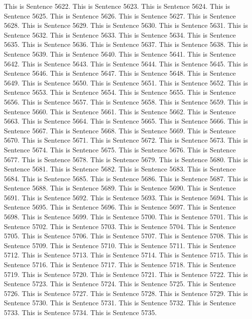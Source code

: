 \documentclass{article}
\begin{document}
This is Sentence 5622.
This is Sentence 5623.
This is Sentence 5624.
This is Sentence 5625.
This is Sentence 5626.
This is Sentence 5627.
This is Sentence 5628.
This is Sentence 5629.
This is Sentence 5630.
This is Sentence 5631.
This is Sentence 5632.
This is Sentence 5633.
This is Sentence 5634.
This is Sentence 5635.
This is Sentence 5636.
This is Sentence 5637.
This is Sentence 5638.
This is Sentence 5639.
This is Sentence 5640.
This is Sentence 5641.
This is Sentence 5642.
This is Sentence 5643.
This is Sentence 5644.
This is Sentence 5645.
This is Sentence 5646.
This is Sentence 5647.
This is Sentence 5648.
This is Sentence 5649.
This is Sentence 5650.
This is Sentence 5651.
This is Sentence 5652.
This is Sentence 5653.
This is Sentence 5654.
This is Sentence 5655.
This is Sentence 5656.
This is Sentence 5657.
This is Sentence 5658.
This is Sentence 5659.
This is Sentence 5660.
This is Sentence 5661.
This is Sentence 5662.
This is Sentence 5663.
This is Sentence 5664.
This is Sentence 5665.
This is Sentence 5666.
This is Sentence 5667.
This is Sentence 5668.
This is Sentence 5669.
This is Sentence 5670.
This is Sentence 5671.
This is Sentence 5672.
This is Sentence 5673.
This is Sentence 5674.
This is Sentence 5675.
This is Sentence 5676.
This is Sentence 5677.
This is Sentence 5678.
This is Sentence 5679.
This is Sentence 5680.
This is Sentence 5681.
This is Sentence 5682.
This is Sentence 5683.
This is Sentence 5684.
This is Sentence 5685.
This is Sentence 5686.
This is Sentence 5687.
This is Sentence 5688.
This is Sentence 5689.
This is Sentence 5690.
This is Sentence 5691.
This is Sentence 5692.
This is Sentence 5693.
This is Sentence 5694.
This is Sentence 5695.
This is Sentence 5696.
This is Sentence 5697.
This is Sentence 5698.
This is Sentence 5699.
This is Sentence 5700.
This is Sentence 5701.
This is Sentence 5702.
This is Sentence 5703.
This is Sentence 5704.
This is Sentence 5705.
This is Sentence 5706.
This is Sentence 5707.
This is Sentence 5708.
This is Sentence 5709.
This is Sentence 5710.
This is Sentence 5711.
This is Sentence 5712.
This is Sentence 5713.
This is Sentence 5714.
This is Sentence 5715.
This is Sentence 5716.
This is Sentence 5717.
This is Sentence 5718.
This is Sentence 5719.
This is Sentence 5720.
This is Sentence 5721.
This is Sentence 5722.
This is Sentence 5723.
This is Sentence 5724.
This is Sentence 5725.
This is Sentence 5726.
This is Sentence 5727.
This is Sentence 5728.
This is Sentence 5729.
This is Sentence 5730.
This is Sentence 5731.
This is Sentence 5732.
This is Sentence 5733.
This is Sentence 5734.
This is Sentence 5735.
\end{document}
